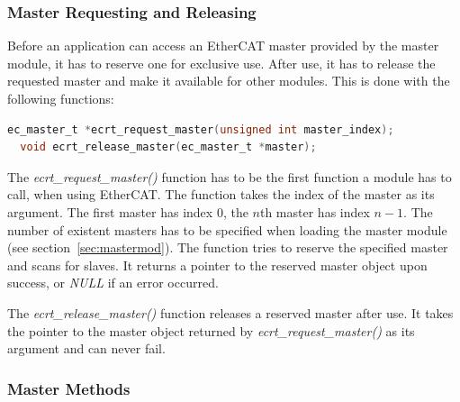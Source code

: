 \documentclass[a4paper,12pt,BCOR6mm,bibtotoc,idxtotoc]{scrbook}
\begin{document}
% 
% 

\subsubsection{Master Requesting and Releasing}

Before an application can access an EtherCAT master provided by the
master module, it has to reserve one for exclusive use. After use, it
has to release the requested master and make it available for other
modules. This is done with the following functions:

\begin{lstlisting}[gobble=2,language=C]
  ec_master_t *ecrt_request_master(unsigned int master_index);
  void ecrt_release_master(ec_master_t *master);
\end{lstlisting}

The \textit{ecrt\_request\_master()} function has to be the first function a
module has to call, when using EtherCAT. The function takes the index of the
master as its argument. The first master has index 0, the $n$th master has
index $n - 1$. The number of existent masters has to be specified when loading
the master module (see section~\ref{sec:mastermod}). The function tries to
reserve the specified master and scans for slaves. It returns a pointer to the
reserved master object upon success, or \textit{NULL} if an error occurred.

The \textit{ecrt\_release\_master()} function releases a reserved
master after use. It takes the pointer to the master object returned
by \textit{ecrt\_request\_master()} as its argument and can never
fail.

\subsubsection{Master Methods}
\label{sec:ecrt-master}
\end{document}
